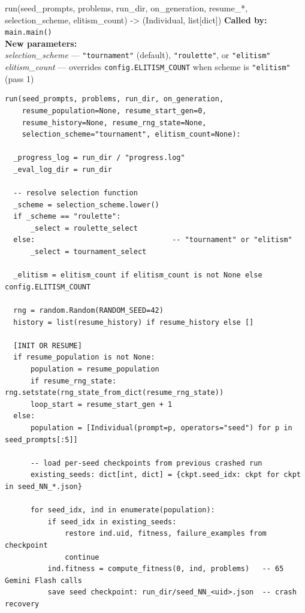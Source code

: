 \documentclass[11pt,a4paper]{report}
\newcommand{\fn}[1]{\texttt{#1}}
\newcommand{\param}[1]{\textit{#1}}
\begin{document}
\begin{specbox}{run(seed\_prompts, problems, run\_dir, on\_generation, resume\_*, selection\_scheme, elitism\_count) -> (Individual, list[dict])}
\textbf{Called by:} \fn{main.main()}\\
\textbf{New parameters:}\\
\hspace{1em}\param{selection\_scheme} --- \fn{"tournament"} (default), \fn{"roulette"}, or \fn{"elitism"}\\
\hspace{1em}\param{elitism\_count} --- overrides \fn{config.ELITISM\_COUNT} when scheme is \fn{"elitism"} (pass 1)
\end{specbox}

\begin{lstlisting}[style=chain]
run(seed_prompts, problems, run_dir, on_generation,
    resume_population=None, resume_start_gen=0,
    resume_history=None, resume_rng_state=None,
    selection_scheme="tournament", elitism_count=None):

  _progress_log = run_dir / "progress.log"
  _eval_log_dir = run_dir

  -- resolve selection function
  _scheme = selection_scheme.lower()
  if _scheme == "roulette":
      _select = roulette_select
  else:                                -- "tournament" or "elitism"
      _select = tournament_select

  _elitism = elitism_count if elitism_count is not None else config.ELITISM_COUNT

  rng = random.Random(RANDOM_SEED=42)
  history = list(resume_history) if resume_history else []

  [INIT OR RESUME]
  if resume_population is not None:
      population = resume_population
      if resume_rng_state: rng.setstate(rng_state_from_dict(resume_rng_state))
      loop_start = resume_start_gen + 1
  else:
      population = [Individual(prompt=p, operators="seed") for p in seed_prompts[:5]]

      -- load per-seed checkpoints from previous crashed run
      existing_seeds: dict[int, dict] = {ckpt.seed_idx: ckpt for ckpt in seed_NN_*.json}

      for seed_idx, ind in enumerate(population):
          if seed_idx in existing_seeds:
              restore ind.uid, fitness, failure_examples from checkpoint
              continue
          ind.fitness = compute_fitness(0, ind, problems)   -- 65 Gemini Flash calls
          save seed checkpoint: run_dir/seed_NN_<uid>.json  -- crash recovery


\end{lstlisting}
\end{document}
